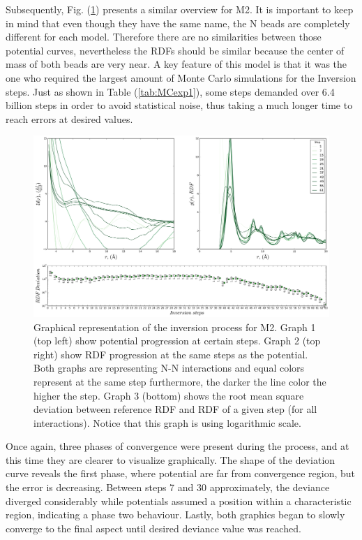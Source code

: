 \documentclass[10pt,a4paper,twoside]{article}
\begin{document}
Subsequently, Fig. (\ref{Fig:convM2}) presents a similar overview for M2. It is important to keep in mind that even though they have the same name, the N beads are completely different for each model. Therefore there are no similarities between those potential curves, nevertheless the RDFs should be similar because the center of mass of both beads are very near. A key feature of this model is that it was the one who required the largest amount of Monte Carlo simulations for the Inversion steps. Just as shown in Table (\ref{tab:MCexp1}), some steps demanded over 6.4 billion steps in order to avoid statistical noise, thus taking a much longer time to reach errors at desired values.

\begin{figure}[H]
  \begin{center}
	\includegraphics[width=1 \textwidth]{./graphs/ConvM2}
	\caption{Graphical representation of the inversion process for M2. Graph 1 (top left) show potential progression at certain steps. Graph 2 (top right) show RDF progression at the same steps as the potential. Both graphs are representing N-N interactions and equal colors represent at the same step furthermore, the darker the line color the higher the step. Graph 3 (bottom) shows the root mean square deviation between reference RDF and RDF of a given step (for all interactions). Notice that this graph is using logarithmic scale.}
	\label{Fig:convM2}
  \end{center}
\end{figure} 
 
	Once again, three phases of convergence were present during the process, and at this time they are clearer to visualize graphically. The shape of the deviation curve reveals the first phase, where potential are far from convergence region, but the error is decreasing. Between 
steps 7 and 30 approximately, the deviance diverged considerably while potentials assumed a position within a characteristic region, indicating a phase two behaviour. Lastly, both graphics began to slowly converge to the final aspect until desired deviance value was reached.
\end{document}
